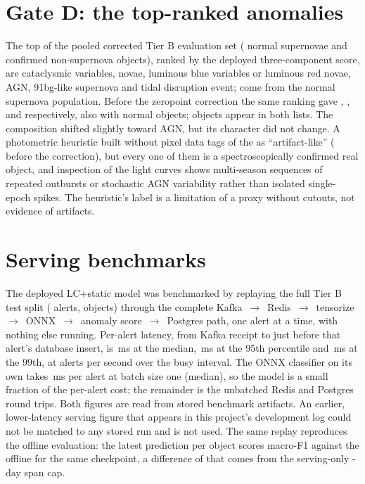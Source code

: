 \section{Gate D: the top-ranked anomalies}
\label{sec:gated}

The top \GateDNTotal{} of the pooled corrected Tier B evaluation set
(\AnomalyTierBNNormal{} normal supernovae and \AnomalyTierBNAnomalous{}
confirmed non-supernova objects), ranked by the deployed three-component
score, are \GateDNNoTreeNode{} cataclysmic variables, novae, luminous blue
variables or luminous red novae, \GateDNAGN{} AGN, \GateDNNinetyOneBG{}
91bg-like supernova and \GateDNTDE{} tidal disruption event;
\GateDNFromNormal{} come from the normal supernova population. Before the
zeropoint correction the same ranking gave \GateDPreFixNNoTreeNode{},
\GateDPreFixNAGN{}, \GateDPreFixNNinetyOneBG{} and \GateDPreFixNTDE{}
respectively, also with \GateDPreFixNFromNormal{} normal objects;
\GateDOverlapPreFix{} objects appear in both lists. The composition shifted
slightly toward AGN, but its character did not change. A photometric
heuristic built without pixel data tags \GateDNArtifactLike{} of the
\GateDNTotal{} as ``artifact-like'' (\GateDPreFixNArtifactLike{} before the
correction), but every one of them is a spectroscopically confirmed real
object, and inspection of the light curves shows multi-season sequences of
repeated outbursts or stochastic AGN variability rather than isolated
single-epoch spikes. The heuristic's label is a limitation of a proxy
without cutouts, not evidence of artifacts.

\section{Serving benchmarks}

The deployed LC+static model was benchmarked by replaying the full Tier B
test split (\ServingNAlerts{} alerts, \ServingNObjects{} objects) through the
complete Kafka~$\to$~Redis~$\to$~tensorize~$\to$~ONNX~$\to$~anomaly
score~$\to$~Postgres path, one alert at a time, with nothing else running.
Per-alert latency, from Kafka receipt to just before that alert's database
insert, is \ServingLatencyPFifty{}\,ms at the median,
\ServingLatencyPNinetyFive{}\,ms at the 95th percentile and
\ServingLatencyPNinetyNine{}\,ms at the 99th, at \ServingThroughput{}
alerts per second over the busy interval. The ONNX classifier on its own
takes \OnnxMsPerAlertBatchOne{}\,ms per alert at batch size one (median),
so the model is a small fraction of the per-alert cost; the remainder is
the unbatched Redis and Postgres round trips. Both figures are read from
stored benchmark artifacts. An earlier, lower-latency serving figure that
appears in this project's development log could not be matched to any
stored run and is not used. The same replay reproduces the offline
evaluation: the latest prediction per object scores macro-F1
\ReplayMacroF{} against the offline \DeployedMacroF{} for the same
checkpoint, a difference of \ReplayOfflineGap{} that comes from the
serving-only \SpanChosenDefault{}-day span cap.

